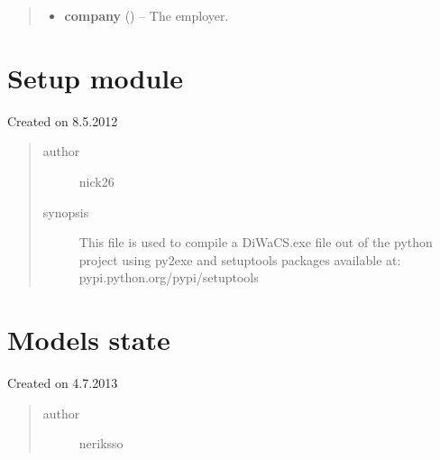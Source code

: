 \documentclass[letterpaper,10pt,english]{sphinxmanual}
\begin{document}
\begin{fulllineitems}
\begin{quote}
\begin{description}
\begin{itemize}
\item {} 
\textbf{company} ({\hyperref[models:models.Company]{}}) -- The employer.

\end{itemize}

\end{description}\end{quote}

\end{fulllineitems}



\section{Setup module}
\label{setup:setup-module}\label{setup::doc}
Created on 8.5.2012
\begin{quote}\begin{description}
\item[{author}] \leavevmode
nick26

\item[{synopsis}] \leavevmode
This file is used to compile a DiWaCS.exe file out of the python project
using py2exe and setuptools packages available at:
pypi.python.org/pypi/setuptools

\end{description}\end{quote}


\section{Models state}
\label{state:module-state}\label{state::doc}\label{state:models-state}
Created on 4.7.2013
\begin{quote}\begin{description}
\item[{author}] \leavevmode
neriksso

\end{description}\end{quote}
\end{document}
